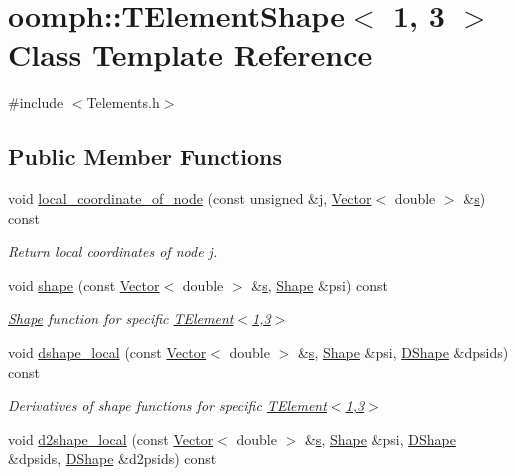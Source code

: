\hypertarget{classoomph_1_1TElementShape_3_011_00_013_01_4}{}\section{oomph\+:\+:T\+Element\+Shape$<$ 1, 3 $>$ Class Template Reference}
\label{classoomph_1_1TElementShape_3_011_00_013_01_4}


{\ttfamily \#include $<$Telements.\+h$>$}

\subsection*{Public Member Functions}
\begin{DoxyCompactItemize}
\item 
void \hyperlink{classoomph_1_1TElementShape_3_011_00_013_01_4_a08e97f9735505002c27e524d86371e5b}{local\+\_\+coordinate\+\_\+of\+\_\+node} (const unsigned \&j, \hyperlink{classoomph_1_1Vector}{Vector}$<$ double $>$ \&\hyperlink{cfortran_8h_ab7123126e4885ef647dd9c6e3807a21c}{s}) const
\begin{DoxyCompactList}\small\item\em Return local coordinates of node j. \end{DoxyCompactList}\item 
void \hyperlink{classoomph_1_1TElementShape_3_011_00_013_01_4_adf2d6ccfcceccd657650bb25d685b00c}{shape} (const \hyperlink{classoomph_1_1Vector}{Vector}$<$ double $>$ \&\hyperlink{cfortran_8h_ab7123126e4885ef647dd9c6e3807a21c}{s}, \hyperlink{classoomph_1_1Shape}{Shape} \&psi) const
\begin{DoxyCompactList}\small\item\em \hyperlink{classoomph_1_1Shape}{Shape} function for specific \hyperlink{classoomph_1_1TElement}{T\+Element$<$1,3$>$} \end{DoxyCompactList}\item 
void \hyperlink{classoomph_1_1TElementShape_3_011_00_013_01_4_a47bfa41ceb5f7df0b6ba774c653a9ea3}{dshape\+\_\+local} (const \hyperlink{classoomph_1_1Vector}{Vector}$<$ double $>$ \&\hyperlink{cfortran_8h_ab7123126e4885ef647dd9c6e3807a21c}{s}, \hyperlink{classoomph_1_1Shape}{Shape} \&psi, \hyperlink{classoomph_1_1DShape}{D\+Shape} \&dpsids) const
\begin{DoxyCompactList}\small\item\em Derivatives of shape functions for specific \hyperlink{classoomph_1_1TElement}{T\+Element$<$1,3$>$} \end{DoxyCompactList}\item 
void \hyperlink{classoomph_1_1TElementShape_3_011_00_013_01_4_a58380921c91e5fb9d5e3e47deb4f6354}{d2shape\+\_\+local} (const \hyperlink{classoomph_1_1Vector}{Vector}$<$ double $>$ \&\hyperlink{cfortran_8h_ab7123126e4885ef647dd9c6e3807a21c}{s}, \hyperlink{classoomph_1_1Shape}{Shape} \&psi, \hyperlink{classoomph_1_1DShape}{D\+Shape} \&dpsids, \hyperlink{classoomph_1_1DShape}{D\+Shape} \&d2psids) const
\end{DoxyCompactItemize}


